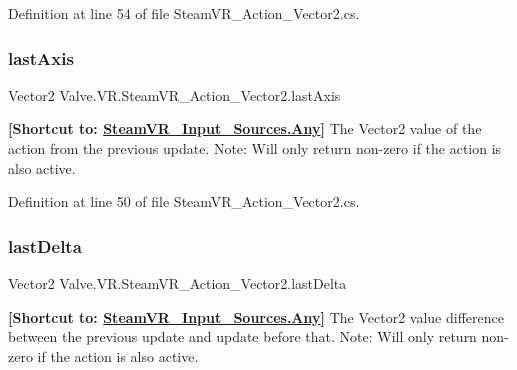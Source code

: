 Definition at line 54 of file Steam\+V\+R\+\_\+\+Action\+\_\+\+Vector2.\+cs.

\mbox{\label{class_valve_1_1_v_r_1_1_steam_v_r___action___vector2_abfaa7777e33e79208c25062cba77d687}} 
\subsubsection{\texorpdfstring{lastAxis}{lastAxis}}
{\footnotesize\ttfamily Vector2 Valve.\+V\+R.\+Steam\+V\+R\+\_\+\+Action\+\_\+\+Vector2.\+last\+Axis\hspace{0.3cm}{\ttfamily [get]}}



{\bfseries{\mbox{[}Shortcut to\+: \mbox{\hyperlink{namespace_valve_1_1_v_r_a82e5bf501cc3aa155444ee3f0662853faed36a1ef76a59ee3f15180e0441188ad}{Steam\+V\+R\+\_\+\+Input\+\_\+\+Sources.\+Any}}\mbox{]}}} The Vector2 value of the action from the previous update. Note\+: Will only return non-\/zero if the action is also active. 



Definition at line 50 of file Steam\+V\+R\+\_\+\+Action\+\_\+\+Vector2.\+cs.

\mbox{\label{class_valve_1_1_v_r_1_1_steam_v_r___action___vector2_a64aa5d73aa92d61abf982584d29a7175}} 
\subsubsection{\texorpdfstring{lastDelta}{lastDelta}}
{\footnotesize\ttfamily Vector2 Valve.\+V\+R.\+Steam\+V\+R\+\_\+\+Action\+\_\+\+Vector2.\+last\+Delta\hspace{0.3cm}{\ttfamily [get]}}



{\bfseries{\mbox{[}Shortcut to\+: \mbox{\hyperlink{namespace_valve_1_1_v_r_a82e5bf501cc3aa155444ee3f0662853faed36a1ef76a59ee3f15180e0441188ad}{Steam\+V\+R\+\_\+\+Input\+\_\+\+Sources.\+Any}}\mbox{]}}} The Vector2 value difference between the previous update and update before that. Note\+: Will only return non-\/zero if the action is also active. 



